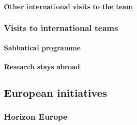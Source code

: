 \paragraph{Other international visits to the team}


\subsubsection{Visits to international teams}
\paragraph{Sabbatical programme}
\paragraph{Research stays abroad}



\subsection{European initiatives}
\subsubsection{Horizon Europe}

